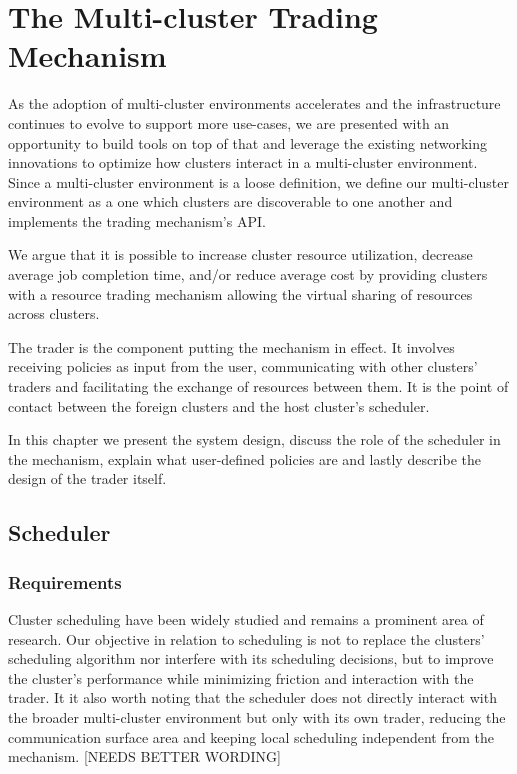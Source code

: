 
\chapter{The Multi-cluster Trading Mechanism}

As the adoption of multi-cluster environments accelerates and the
infrastructure continues to evolve to support more use-cases, we are presented
with an opportunity to build tools on top of that and leverage the existing
networking innovations to optimize how clusters interact in a multi-cluster
environment. Since a multi-cluster environment is a loose definition, we define
our multi-cluster environment as a one which clusters are discoverable to one
another and implements the trading mechanism's API.

We argue that it is possible to increase cluster resource utilization,
decrease average job completion time, and/or reduce average cost by providing
clusters with a resource trading mechanism allowing the virtual sharing of
resources across clusters. 

The trader is the component putting the mechanism in effect. It involves
receiving policies as input from the user, communicating with other clusters'
traders and facilitating the exchange of resources between them. It is the
point of contact between the foreign clusters and the host cluster's scheduler.

In this chapter we present the system design, discuss the role of the scheduler
in the mechanism, explain what user-defined policies are and lastly describe
the design of the trader itself. 


\section{Scheduler}
\subsection{Requirements}
Cluster scheduling have been widely studied and remains a prominent area of
research. Our objective in relation to scheduling is not to replace the
clusters' scheduling algorithm nor interfere with its scheduling decisions, but
to improve the cluster's performance while minimizing friction and interaction
with the trader. It it also worth noting that the scheduler does not directly
interact with the broader multi-cluster environment but only with its own
trader, reducing the communication surface area and keeping local scheduling
independent from the mechanism. [NEEDS BETTER WORDING]


